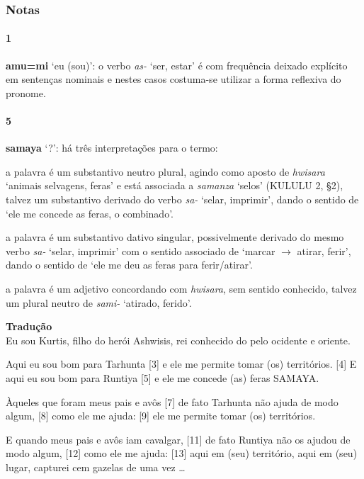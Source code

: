 \subsubsection*{Notas}

\paragraph{1}
\textbf{amu=mi} `eu (sou)': o verbo \emph{as-} `ser, estar' é com frequência deixado
explícito em sentenças nominais e nestes casos costuma-se utilizar a
forma reflexiva do pronome.

\paragraph{5}
\textbf{samaya} `?': há três interpretações para o termo:
\begin{inparaenum}
	\item a palavra é um substantivo neutro plural, agindo como aposto de
	\emph{hwisara} `animais selvagens, feras' e está associada a
	\emph{samanza} `selos' (KULULU 2, §2), talvez um substantivo derivado do
	verbo \emph{sa-} `selar, imprimir',
	dando o sentido de `ele me concede as feras, o combinado'.
	\item a palavra é um substantivo dativo singular, possivelmente derivado do
	mesmo verbo \emph{sa-} `selar, imprimir' com o sentido associado de
	`marcar $\rightarrow$ atirar, ferir', dando o sentido de `ele me deu as
	feras para ferir\slash{}atirar'.
	\item a palavra é um adjetivo concordando com \emph{hwisara}, sem sentido
	conhecido, talvez um plural neutro de \emph{sami-} `atirado, ferido'.
\end{inparaenum}

\bigskip
\noindent \textbf{Tradução}\\
\noindent [1] Eu sou Kurtis, filho do herói Ashwisis, rei conhecido do
pelo ocidente e oriente.

\noindent [2] Aqui eu sou bom para Tarhunta [3] e ele me
permite tomar (os) territórios.
[4] E aqui eu sou bom para Runtiya [5] e ele me concede (as) feras SAMAYA\@.

\noindent [6] Àqueles que foram meus pais e avôs [7] de fato Tarhunta não
ajuda de modo algum, [8] como ele me ajuda: [9] ele me permite tomar (os)
territórios.

\noindent [10] E quando meus pais e avôs iam cavalgar, [11] de fato Runtiya não
os ajudou de modo algum, [12] como ele me ajuda: [13] aqui em (seu) território,
aqui em (seu) lugar, capturei cem gazelas de uma vez \ldots
